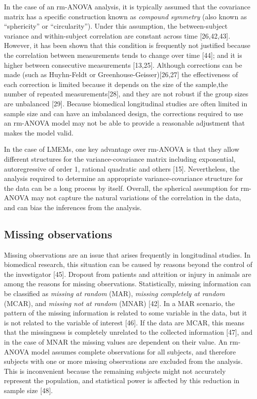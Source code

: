 \documentclass[
]{article}
\begin{document}
In the case of an rm-ANOVA analysis, it is typically assumed that the covariance matrix has a specific construction known as \emph{compound symmetry} (also known as ``sphericity'' or ``circularity''). Under this assumption, the between-subject variance and within-subject correlation are constant across time {[}26,42,43{]}. However, it has been shown that this condition is frequently not justified because the correlation between measurements tends to change over time {[}44{]}; and it is higher between consecutive measurements {[}13,25{]}. Although corrections can be made (such as Huyhn-Feldt or Greenhouse-Geisser){[}26,27{]} the effectiveness of each correction is limited because it depends on the size of the sample,the number of repeated measurements{[}28{]}, and they are not robust if the group sizes are unbalanced {[}29{]}. Because biomedical longitudinal studies are often limited in sample size and can have an imbalanced design, the corrections required to use an rm-ANOVA model may not be able to provide a reasonable adjustment that makes the model valid.

In the case of LMEMs, one key advantage over rm-ANOVA is that they allow different structures for the variance-covariance matrix including exponential, autoregressive of order 1, rational quadratic and others {[}15{]}. Nevertheless, the analysis required to determine an appropriate variance-covariance structure for the data can be a long process by itself. Overall, the spherical assumption for rm-ANOVA may not capture the natural variations of the correlation in the data, and can bias the inferences from the analysis.

\hypertarget{missing-observations}{%
\subsection{Missing observations}\label{missing-observations}}

Missing observations are an issue that arises frequently in longitudinal studies. In biomedical research, this situation can be caused by reasons beyond the control of the investigator {[}45{]}. Dropout from patients and attrition or injury in animals are among the reasons for missing observations. Statistically, missing information can be classified as \emph{missing at random} (MAR), \emph{missing completely at random} (MCAR), and \emph{missing not at random} (MNAR) {[}42{]}. In a MAR scenario, the pattern of the missing information is related to some variable in the data, but it is not related to the variable of interest {[}46{]}. If the data are MCAR, this means that the missingness is completely unrelated to the collected information {[}47{]}, and in the case of MNAR the missing values are dependent on their value. An rm-ANOVA model assumes complete observations for all subjects, and therefore subjects with one or more missing observations are excluded from the analysis. This is inconvenient because the remaining subjects might not accurately represent the population, and statistical power is affected by this reduction in sample size {[}48{]}.
\end{document}

